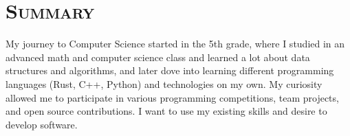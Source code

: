 \vspace*{-3em}
\section{\textsc{Summary}}

\qquad My journey to Computer Science started in the 5th grade, where I studied in an advanced math and computer science class and learned a lot about data structures and algorithms, and later dove into learning different programming languages (Rust, C++, Python) and technologies on my own. My curiosity allowed me to participate in various programming competitions, team projects, and open source contributions. I want to use my existing skills and desire to develop software.

